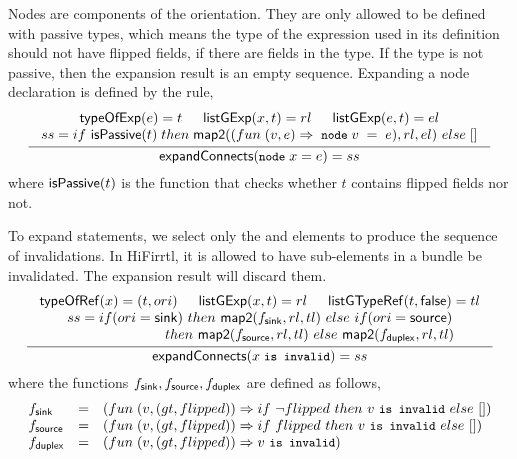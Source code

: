 Nodes are components of the {\source} orientation. 
They are only allowed to be defined with passive types, which means the type of the expression used in its definition should not have flipped fields, if there are fields in the type. 
If the type is not passive, then the expansion result is  an empty sequence. Expanding a node declaration is defined by the rule, 
\begin{gather*}
  \label{expand-node}
  \infer[]
        {\seqq{\expandconnects (\mbox{\prettyll{node }}\; x = e) = ss}}
        {\begin{array}{c}
            \typeofexp(e) = t  \hspace{15pt} \listgexp(x, t) = rl \hspace{15pt} \listgexp(e, t) = el \\
             ss= if\ \ispassive(t)\; then\;  \fmaptwo((fun\; (v,e) \Rightarrow \; \mbox{\prettyll{node}}\; v\;=\;e), rl,el)\ else\; []
          \end{array}
        }
\end{gather*}
where ${\sf isPassive}(t)$ is the function that checks whether $t$ contains flipped fields nor not. 

To expand  statements, we
select only the {\sink} and {\duplex} elements to produce the sequence of
invalidations.
In HiFirrtl, it is allowed to have {\source} sub-elements in a bundle be
invalidated. The expansion result will discard them.
\begin{gather*}
  \label{expand-invalid}
  \infer[]
        {\seqq{\expandconnects(x\;\mbox{\prettyll{is invalid}}) = ss}}
        {\begin{array}{c}
             \typeofref(x) = (t, ori) \hspace{15pt} \listgexp(x, t) = rl \hspace{15pt}  \listgtyperef(t, \lfalse) = tl   \\
             ss = if(ori = \sink) \ then\  \fmaptwo(f_{\sink}, rl, tl)\ else\ if(ori = \source)\\
             \hspace{2.5cm} then\ \fmaptwo(f_{\source}, rl, tl)\ else\ \fmaptwo(f_{\duplex}, rl, tl)
          \end{array}
        } 
\end{gather*}
where the functions $f_{{\sf sink}},f_{{\sf source}}, f_{{\sf duplex}}$ are defined as follows, 
\[
\begin{array}{ l c l}
f_\sink & = & (fun\;(v, (gt, flipped)) \Rightarrow if\ \neg flipped \ then\ v\ \mbox{\prettyll{is invalid}}\ else\ [])
\\
f_\source & = & (fun\;(v, (gt, flipped)) \Rightarrow if\ flipped \ then\ v\ \mbox{\prettyll{is invalid}}\ else\ [])
\\
f_\duplex & = & (fun\;(v, (gt, flipped)) \Rightarrow v\ \mbox{\prettyll{is invalid}})
\end{array}
\]

